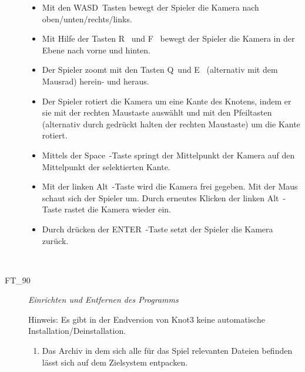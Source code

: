 \begin{description}
	\begin{itemize} 
	
        \item Mit den \glqq WASD\grqq~Tasten bewegt der Spieler die Kamera nach oben/unten/rechts/links.
        
        \item Mit Hilfe der Tasten \glqq R\grqq~ und \glqq F\grqq~ bewegt der Spieler die Kamera in der Ebene nach vorne und hinten.
        
        \item Der Spieler zoomt mit den Tasten \glqq Q\grqq~und \glqq E\grqq~ (alternativ mit dem Mausrad) herein- und heraus.
        
        \item Der Spieler rotiert die Kamera um eine Kante des Knotens, indem er sie mit der rechten Maustaste auswählt und mit den Pfeiltasten (alternativ durch gedrückt halten der rechten Maustaste) um die Kante rotiert.
        
        \item Mittels der \glqq Space\grqq~-Taste springt der Mittelpunkt der Kamera auf den Mittelpunkt der selektierten Kante.
        
        \item Mit der linken \glqq Alt\grqq~-Taste wird die Kamera frei gegeben. Mit der Maus schaut sich der Spieler um. Durch erneutes Klicken der linken \glqq Alt\grqq~-Taste rastet die Kamera wieder ein.
        
        \item Durch drücken der \glqq ENTER\grqq~-Taste setzt der Spieler die Kamera zurück.
        
        ~\\
		
		\end{itemize}
		
		


	\item[FT\_90] \textit{Einrichten und Entfernen des Programms} \hfill\\

	\label{FT:TEST90}
	
	Hinweis: Es gibt in der Endversion von Knot3 keine automatische Installation/Deinstallation.\\
		
	\begin{enumerate}

		\item Das Archiv in dem sich alle für das Spiel relevanten Dateien befinden lässt sich auf dem Zielsystem entpacken.
		

\end{enumerate}
\end{description}
